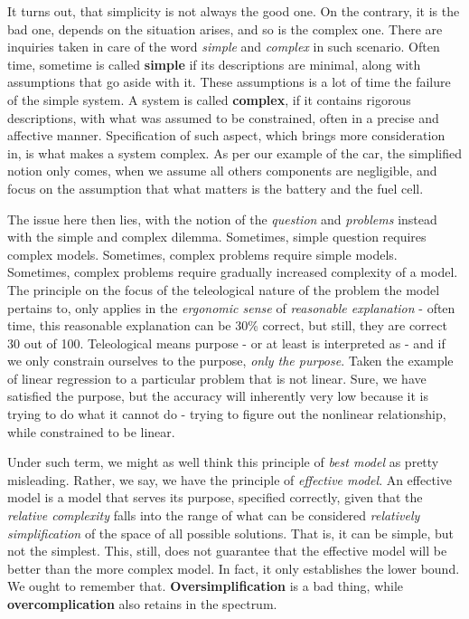 It turns out, that simplicity is not always the good one. On the contrary, it is the bad one, depends on the situation arises, and so is the complex one. There are inquiries taken in care of the word \textit{simple} and \textit{complex} in such scenario. Often time, sometime is called \textbf{simple} if its descriptions are minimal, along with assumptions that go aside with it. These assumptions is a lot of time the failure of the simple system. A system is called \textbf{complex}, if it contains rigorous descriptions, with what was assumed to be constrained, often in a precise and affective manner. Specification of such aspect, which brings more consideration in, is what makes a system complex. As per our example of the car, the simplified notion only comes, when we assume all others components are negligible, and focus on the assumption that what matters is the battery and the fuel cell. 

The issue here then lies, with the notion of the \textit{question} and \textit{problems} instead with the simple and complex dilemma. Sometimes, simple question requires complex models. Sometimes, complex problems require simple models. Sometimes, complex problems require gradually increased complexity of a model. The principle on the focus of the teleological nature of the problem the model pertains to, only applies in the \textit{ergonomic sense} of \textit{reasonable explanation} - often time, this reasonable explanation can be 30\% correct, but still, they are correct 30 out of 100. Teleological means purpose - or at least is interpreted as - and if we only constrain ourselves to the purpose, \textit{only the purpose}. Taken the example of linear regression to a particular problem that is not linear. Sure, we have satisfied the purpose, but the accuracy will inherently very low because it is trying to do what it cannot do - trying to figure out the nonlinear relationship, while constrained to be linear. 

Under such term, we might as well think this principle of \textit{best model} as pretty misleading. Rather, we say, we have the principle of \textit{effective model}. An effective model is a model that serves its purpose, specified correctly, given that the \textit{relative complexity} falls into the range of what can be considered \textit{relatively simplification} of the space of all possible solutions. That is, it can be simple, but not the simplest.  This, still, does not guarantee that the effective model will be better than the more complex model. In fact, it only establishes the lower bound. We ought to remember that. \textbf{Oversimplification} is a bad thing, while \textbf{overcomplication} also retains in the spectrum.

